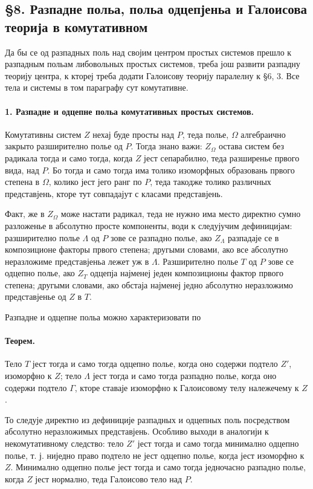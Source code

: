 ﻿\documentclass[11pt]{article}
\begin{document}
\subsection*{§8. Разпадне польа, польа одцепјеньа и Галоисова теорија в комутативном}

Да бы се од разпадных поль над својим центром простых системов прешло к разпадным польам либовольных простых системов, треба још развити разпадну теорију центра, к ктореј треба додати Галоисову теорију паралелну к §6, 3. Все тела и системы в том параграфу сут комутативне.

\paragraph{1. Разпадне и одцепне польа комутативных простых системов.}
Комутативны систем \(Z\) нехај буде просты над \(P\), теда полье, \(\Omega\) алгебраично закрыто разширително полье од \(P\). Тогда знано важи: \(Z_\Omega\) остава систем без радикала тогда и само тогда, когда \(Z\) јест сепарабилно, теда разширенье првого вида, над \(P\). Бо тогда и само тогда има толико изоморфных образовань првого степена в \(\Omega\), колико јест јего ранг по \(P\), теда такодже толико различных представјень, кторе тут совпадајут с класами представјень.

Факт, же в \(Z_\Omega\) може настати радикал, теда не нужно има место директно сумно разложенье в абсолутно просте компоненты, води к следујучим дефиницијам: разширително полье \(\Lambda\) од \(P\) зове се разпадно полье, ако \(Z_\Lambda\) разпадаје се в композиционе факторы првого степена; другыми словами, ако все абсолутно неразложиме представјеньа лежет уж в \(\Lambda\). Разширително полье \(T\) од \(P\) зове се одцепно полье, ако \(Z_T\) одцепја најменеј једен композиционы фактор првого степена; другыми словами, ако обстаја најменеј једно абсолутно неразложимо представјенье од \(Z\) в \(T\).

Разпадне и одцепне польа можно характеризовати по

\paragraph{Теорем.}
Тело \(T\) јест тогда и само тогда одцепно полье, когда оно содержи подтело \(Z'\), изоморфно к \(Z\); тело \(\Lambda\) јест тогда и само тогда разпадно полье, когда оно содержи подтело \(\Gamma\), кторе ставаје изоморфно к Галоисовому телу належечему к \(Z\).

То следује директно из дефиниције разпадных и одцепных поль посредством абсолутно неразложимых представјень. Особливо выходи в аналогији к некомутативному следство: тело \(Z'\) јест тогда и само тогда минимално одцепно полье, т. ј. ниједно право подтело не јест одцепно полье, когда јест изоморфно к \(Z\). Минимално одцепно полье јест тогда и само тогда једночасно разпадно полье, когда \(Z\) јест нормално, теда Галоисово тело над \(P\).
\end{document}

